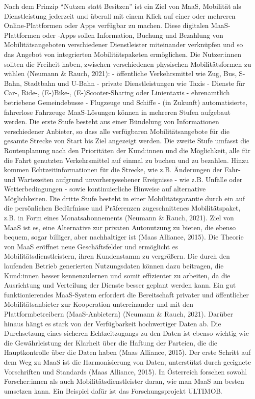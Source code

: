 \documentclass[
]{book}
\begin{document}
Nach dem Prinzip ``Nutzen statt Besitzen'' ist ein Ziel von MaaS, Mobilität als Dienstleistung jederzeit und überall mit einem Klick auf einer oder mehreren Online-Plattformen oder Apps verfügbar zu machen. Diese digitalen MaaS-Plattformen oder -Apps sollen Information, Buchung und Bezahlung von Mobilitätsangeboten verschiedener Dienstleister miteinander verknüpfen und so das Angebot von integrierten Mobilitätspaketen ermöglichen. Die Nutzer:innen sollten die Freiheit haben, zwischen verschiedenen physischen Mobilitätsformen zu wählen (Neumann \& Rauch, 2021):
- öffentliche Verkehrsmittel wie Zug, Bus, S-Bahn, Stadtbahn und U-Bahn
- private Dienstleistungen wie Taxis
- Dienste für Car-, Ride-, (E-)Bike-, (E-)Scooter-Sharing oder Linientaxis
- ehrenamtlich betriebene Gemeindebusse
- Flugzeuge und Schiffe
- (in Zukunft) automatisierte, fahrerlose Fahrzeuge
MaaS-Lösungen können in mehreren Stufen aufgebaut werden. Die erste Stufe besteht aus einer Bündelung von Informationen verschiedener Anbieter, so dass alle verfügbaren Mobilitätsangebote für die gesamte Strecke von Start bis Ziel angezeigt werden. Die zweite Stufe umfasst die Routenplanung nach den Prioritäten der Kund:innen und die Möglichkeit, alle für die Fahrt genutzten Verkehrsmittel auf einmal zu buchen und zu bezahlen. Hinzu kommen Echtzeitinformationen für die Strecke, wie z.B. Änderungen der Fahr- und Wartezeiten aufgrund unvorhergesehener Ereignisse - wie z.B. Unfälle oder Wetterbedingungen - sowie kontinuierliche Hinweise auf alternative Möglichkeiten. Die dritte Stufe besteht in einer Mobilitätsgarantie durch ein auf die persönlichen Bedürfnisse und Präferenzen zugeschnittenes Mobilitätspaket, z.B. in Form eines Monatsabonnements (Neumann \& Rauch, 2021).
Ziel von MaaS ist es, eine Alternative zur privaten Autonutzung zu bieten, die ebenso bequem, sogar billiger, aber nachhaltiger ist (Maas Alliance, 2015). Die Theorie von MaaS eröffnet neue Geschäftsfelder und ermöglicht es Mobilitätsdienstleistern, ihren Kundenstamm zu vergrößern. Die durch den laufenden Betrieb generierten Nutzungsdaten können dazu beitragen, die Kund:innen besser kennenzulernen und somit effizienter zu arbeiten, da die Ausrichtung und Verteilung der Dienste besser geplant werden kann. Ein gut funktionierendes MaaS-System erfordert die Bereitschaft privater und öffentlicher Mobilitätsanbieter zur Kooperation untereinander und mit den Plattformbetreibern (MaaS-Anbietern) (Neumann \& Rauch, 2021). Darüber hinaus hängt es stark von der Verfügbarkeit hochwertiger Daten ab. Die Durchsetzung eines sicheren Echtzeitzugangs zu den Daten ist ebenso wichtig wie die Gewährleistung der Klarheit über die Haftung der Parteien, die die Hauptkontrolle über die Daten haben (Maas Alliance, 2015). Der erste Schritt auf dem Weg zu MaaS ist die Harmonisierung von Daten, unterstützt durch geeignete Vorschriften und Standards (Maas Alliance, 2015). In Österreich forschen sowohl Forscher:innen als auch Mobilitätsdienstleister daran, wie man MaaS am besten umsetzen kann. Ein Beispiel dafür ist das Forschungsprojekt ULTIMOB.
\end{document}
